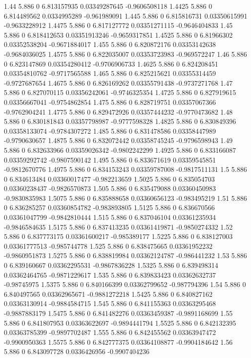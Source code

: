 {1.44 5.886 0 6.813157935 0.03349287645 -0.9606508118
1.4425 5.886 0 6.814489562 0.0334995289 -0.961989091
1.445 5.886 0 6.815816731 0.03350615991 -0.9633228912
1.4475 5.886 0 6.817127772 0.03351271115 -0.9646404833
1.45 5.886 0 6.818412653 0.03351913246 -0.9659317851
1.4525 5.886 0 6.81966302 0.03352538204 -0.9671884017
1.455 5.886 0 6.820872176 0.03353142638 -0.9684036025
1.4575 5.886 0 6.822035007 0.03353723983 -0.969572247
1.46 5.886 0 6.823147869 0.03354280412 -0.9706906733
1.4625 5.886 0 6.824208451 0.03354810762 -0.9717565588
1.465 5.886 0 6.825215621 0.03355314459 -0.9727687654
1.4675 5.886 0 6.826169262 0.03355791438 -0.9737271768
1.47 5.886 0 6.827070115 0.03356242061 -0.9746325354
1.4725 5.886 0 6.827919615 0.03356667041 -0.9754862854
1.475 5.886 0 6.828719751 0.03357067366 -0.9762904241
1.4775 5.886 0 6.829472926 0.03357444232 -0.9770473682
1.48 5.886 0 6.830181843 0.03357798987 -0.9777598328
1.4825 5.886 0 6.830849396 0.03358133074 -0.9784307272
1.485 5.886 0 6.831478586 0.03358447989 -0.9790630657
1.4875 5.886 0 6.832072442 0.03358745245 -0.9796598943
1.49 5.886 0 6.832633966 0.03359026342 -0.9802242299
1.4925 5.886 0 6.833166087 0.03359292742 -0.9807590142
1.495 5.886 0 6.833671619 0.03359545851 -0.9812670776
1.4975 5.886 0 6.834153243 0.03359787008 -0.9817511131
1.5 5.886 0 6.834613484 0.03360017477 -0.982213659
1.5025 5.886 0 6.835054703 0.03360238437 -0.9826570873
1.505 5.886 0 6.835479088 0.03360450983 -0.9830835983
1.5075 5.886 0 6.835888658 0.03360656123 -0.983495219
1.51 5.886 0 6.836285257 0.03360854782 -0.983893805
1.5125 5.886 0 6.836670566 0.03361047799 -0.9842810444
1.515 5.886 0 6.837046104 0.03361235934 -0.9846584635
1.5175 5.886 0 6.837413235 0.03361419871 -0.9850274332
1.52 5.886 0 6.837773175 0.03361600217 -0.985389177
1.5225 5.886 0 6.838127003 0.03361777513 -0.985744778
1.525 5.886 0 6.838475665 0.03361952232 -0.9860951873
1.5275 5.886 0 6.838819984 0.03362124787 -0.986441232
1.53 5.886 0 6.839160667 0.03362295531 -0.9867836228
1.5325 5.886 0 6.839498314 0.03362464765 -0.9871229617
1.535 5.886 0 6.839833423 0.03362632737 -0.98745975
1.5375 5.886 0 6.840166399 0.03362799652 -0.987794396
1.54 5.886 0 6.840497565 0.03362965671 -0.9881272218
1.5425 5.886 0 6.840827162 0.03363130914 -0.9884584715
1.545 5.886 0 6.841155363 0.03363295468 -0.9887883179
1.5475 5.886 0 6.841482276 0.03363459387 -0.9891168699
1.55 5.886 0 6.841807953 0.03363622697 -0.9894441794
1.5525 5.886 0 6.842132395 0.03363785399 -0.9897702487
1.555 5.886 0 6.842455562 0.03363947472 -0.9900950363
1.5575 5.886 0 6.842777375 0.03364108877 -0.9904184642
1.56 5.886 0 6.843097728 0.0336426956 -0.9907404236
}
